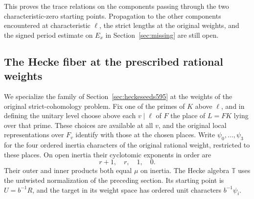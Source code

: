 \documentclass[a4paper,11pt]{article}
\theoremstyle{definition}
\theoremstyle{remark}
\numberwithin{equation}{section}
\begin{document}
This proves the trace relations on the components passing
through the two characteristic-zero starting points.
Propagation to the other components encountered at
characteristic \(\ell\), the strict lengths at the original
weights, and the signed period estimate on \(E_x\) in
Section~\ref{sec:missing} are still open.


\subsection{The Hecke fiber at the prescribed rational weights}
\label{sec:heckefiber596}

We specialize the family of Section~\ref{sec:heckeseeds595} at
the weights of the original strict-cohomology problem. Fix
one of the primes of \(K\) above \(\ell\), and in defining the
unitary level choose above each \(v\mid\ell\) of \(F\) the
place of \(L=FK\) lying over that prime. These choices are
available at all \(v\), and the original local representations
over \(F_v\) identify with those at the chosen places. Write
\(\psi_0,\ldots,\psi_3\) for the four ordered inertia
characters of the original rational weight, restricted to
these places. On open inertia their cyclotomic exponents
in order are
\[
                            r+1,\quad r,\quad 1,\quad 0.
\]
Their outer and inner products both equal \(\mu\) on inertia.
The Hecke algebra \(\mathbb T\) uses the untwisted normalization
of the preceding section. Its starting point is \(U=b^{-1}R\),
and the target in its weight space has ordered unit characters
\(b^{-1}\psi_i\).
\end{document}
